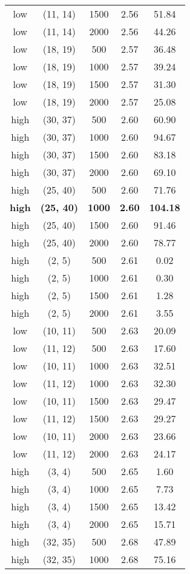 \begin{tabular}{c c c c c}
low & (11, 14) &  1500 & 2.56 & 51.84 \\
low & (11, 14) &  2000 & 2.56 & 44.26 \\
low & (18, 19) &  500 & 2.57 & 36.48 \\
low & (18, 19) &  1000 & 2.57 & 39.24 \\
low & (18, 19) &  1500 & 2.57 & 31.30 \\
low & (18, 19) &  2000 & 2.57 & 25.08 \\
high & (30, 37) &  500 & 2.60 & 60.90 \\
high & (30, 37) &  1000 & 2.60 & 94.67 \\
high & (30, 37) &  1500 & 2.60 & 83.18 \\
high & (30, 37) &  2000 & 2.60 & 69.10 \\
high & (25, 40) &  500 & 2.60 & 71.76 \\
\textbf{high} & \textbf{(25, 40)} & \textbf{ 1000} & \textbf{2.60} & \textbf{104.18} \\
high & (25, 40) &  1500 & 2.60 & 91.46 \\
high & (25, 40) &  2000 & 2.60 & 78.77 \\
high & (2, 5) &  500 & 2.61 & 0.02 \\
high & (2, 5) &  1000 & 2.61 & 0.30 \\
high & (2, 5) &  1500 & 2.61 & 1.28 \\
high & (2, 5) &  2000 & 2.61 & 3.55 \\
low & (10, 11) &  500 & 2.63 & 20.09 \\
low & (11, 12) &  500 & 2.63 & 17.60 \\
low & (10, 11) &  1000 & 2.63 & 32.51 \\
low & (11, 12) &  1000 & 2.63 & 32.30 \\
low & (10, 11) &  1500 & 2.63 & 29.47 \\
low & (11, 12) &  1500 & 2.63 & 29.27 \\
low & (10, 11) &  2000 & 2.63 & 23.66 \\
low & (11, 12) &  2000 & 2.63 & 24.17 \\
high & (3, 4) &  500 & 2.65 & 1.60 \\
high & (3, 4) &  1000 & 2.65 & 7.73 \\
high & (3, 4) &  1500 & 2.65 & 13.42 \\
high & (3, 4) &  2000 & 2.65 & 15.71 \\
high & (32, 35) &  500 & 2.68 & 47.89 \\
high & (32, 35) &  1000 & 2.68 & 75.16 \\

\end{tabular}
